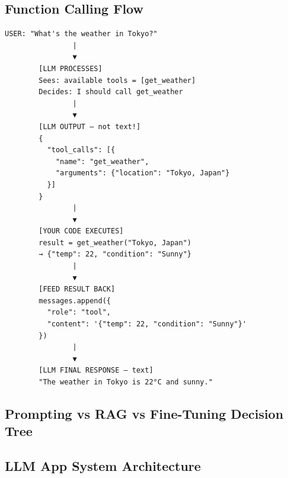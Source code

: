 \documentclass[11pt]{article}
\begin{document}
\subsection{Function Calling Flow}\label{function-calling-flow}

\setcodelang{}

\begin{verbatim}
USER: "What's the weather in Tokyo?"
                |
                ▼
        [LLM PROCESSES]
        Sees: available tools = [get_weather]
        Decides: I should call get_weather
                |
                ▼
        [LLM OUTPUT — not text!]
        {
          "tool_calls": [{
            "name": "get_weather",
            "arguments": {"location": "Tokyo, Japan"}
          }]
        }
                |
                ▼
        [YOUR CODE EXECUTES]
        result = get_weather("Tokyo, Japan")
        → {"temp": 22, "condition": "Sunny"}
                |
                ▼
        [FEED RESULT BACK]
        messages.append({
          "role": "tool",
          "content": '{"temp": 22, "condition": "Sunny"}'
        })
                |
                ▼
        [LLM FINAL RESPONSE — text]
        "The weather in Tokyo is 22°C and sunny."
\end{verbatim}

\subsection{Prompting vs RAG vs Fine-Tuning Decision Tree}\label{prompting-vs-rag-vs-fine-tuning-decision-tree}


\subsection{LLM App System Architecture}\label{llm-app-system-architecture}

\setcodelang{}
\end{document}
